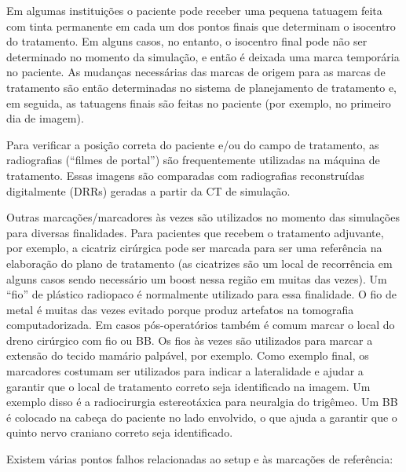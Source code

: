 \documentclass[11pt,a4paper]{article}
\newcounter{exemplo}
\begin{document}
	Em algumas instituições o paciente pode receber uma pequena tatuagem feita com tinta permanente em cada um dos pontos finais que determinam o isocentro do tratamento. Em alguns casos, no entanto, o isocentro final pode não ser determinado no momento da simulação, e então é deixada uma marca temporária no paciente. As mudanças necessárias das marcas de origem para as marcas de tratamento são então determinadas no sistema de planejamento de tratamento e, em seguida, as tatuagens finais são feitas no paciente (por exemplo, no primeiro dia de imagem).
	
	Para verificar a posição correta do paciente e/ou do campo de tratamento, as radiografias (“filmes de portal”) são frequentemente utilizadas na máquina de tratamento. Essas imagens são comparadas com radiografias reconstruídas digitalmente (DRRs) geradas a partir da CT de simulação.

	Outras marcações/marcadores às vezes são utilizados no momento das simulações para diversas finalidades. Para pacientes que recebem o tratamento adjuvante, por exemplo, a cicatriz cirúrgica pode ser marcada para ser uma referência na elaboração do plano de tratamento (as cicatrizes são um local de recorrência em alguns casos sendo necessário um boost nessa região em muitas das vezes). Um “fio” de plástico radiopaco é normalmente utilizado para essa finalidade. O fio de metal é muitas das vezes evitado porque produz artefatos na tomografia computadorizada. Em casos pós-operatórios também é comum marcar o local do dreno cirúrgico com fio ou BB. Os fios às vezes são utilizados para marcar a extensão do tecido mamário palpável, por exemplo. Como exemplo final, os marcadores costumam ser utilizados para indicar a lateralidade e ajudar a garantir que o local de tratamento correto seja identificado na imagem. Um exemplo disso é a radiocirurgia estereotáxica para neuralgia do trigêmeo. Um BB é colocado na cabeça do paciente no lado envolvido, o que ajuda a garantir que o quinto nervo craniano correto seja identificado.

	Existem várias pontos falhos relacionadas ao setup e às marcações de referência:
\end{document}
